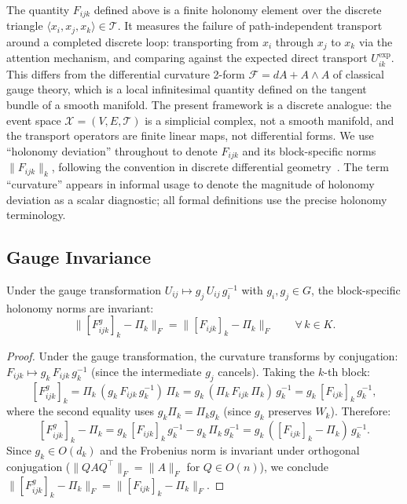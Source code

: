 \begin{remark}
\label{rem:holonomy-vs-curvature}
The quantity $F_{ijk}$ defined above is a finite holonomy element over the discrete
triangle $\langle x_i, x_j, x_k \rangle \in \mathcal{T}$. It measures the failure of
path-independent transport around a completed discrete loop: transporting from $x_i$
through $x_j$ to $x_k$ via the attention mechanism, and comparing against the expected
direct transport $U^{\exp}_{ik}$. This differs from the differential curvature 2-form
$\mathcal{F} = dA + A \wedge A$ of classical gauge theory, which is a local infinitesimal
quantity defined on the tangent bundle of a smooth manifold. The present framework is a
discrete analogue: the event space $\mathcal{X} = (V, E, \mathcal{T})$ is a simplicial
complex, not a smooth manifold, and the transport operators are finite linear maps, not
differential forms. We use ``holonomy deviation'' throughout to denote $F_{ijk}$ and its
block-specific norms $\|F_{ijk}\|_k$, following the convention in discrete differential
geometry~\cite{crane2013discrete}. The term ``curvature'' appears in informal usage to
denote the magnitude of holonomy deviation as a scalar diagnostic; all formal definitions
use the precise holonomy terminology.
\end{remark}

\subsection{Gauge Invariance}
\label{sec:gauge-abstract}

\begin{proposition}
\label{prop:gauge-abstract}
Under the gauge transformation $U_{ij} \mapsto g_j\, U_{ij}\, g_i^{-1}$ with $g_i, g_j
\in G$, the block-specific holonomy norms are invariant:
\[
    \big\|[F^g_{ijk}]_k - \Pi_k\big\|_F = \big\|[F_{ijk}]_k - \Pi_k\big\|_F
    \qquad \forall\, k \in K.
\]
\end{proposition}

\begin{proof}
Under the gauge transformation, the curvature transforms by conjugation:
$F_{ijk} \mapsto g_k\, F_{ijk}\, g_k^{-1}$ (since the intermediate $g_j$ cancels).
Taking the $k$-th block:
\[
    [F^g_{ijk}]_k = \Pi_k\, (g_k\, F_{ijk}\, g_k^{-1})\, \Pi_k
    = g_k\, (\Pi_k\, F_{ijk}\, \Pi_k)\, g_k^{-1}
    = g_k\, [F_{ijk}]_k\, g_k^{-1},
\]
where the second equality uses $g_k \Pi_k = \Pi_k g_k$ (since $g_k$ preserves $W_k$).
Therefore:
\[
    [F^g_{ijk}]_k - \Pi_k
    = g_k\, [F_{ijk}]_k\, g_k^{-1} - g_k\, \Pi_k\, g_k^{-1}
    = g_k\, ([F_{ijk}]_k - \Pi_k)\, g_k^{-1}.
\]
Since $g_k \in O(d_k)$ and the Frobenius norm is invariant under orthogonal conjugation
($\|Q A Q^\top\|_F = \|A\|_F$ for $Q \in O(n)$), we conclude $\|[F^g_{ijk}]_k -
\Pi_k\|_F = \|[F_{ijk}]_k - \Pi_k\|_F$.
\end{proof}

